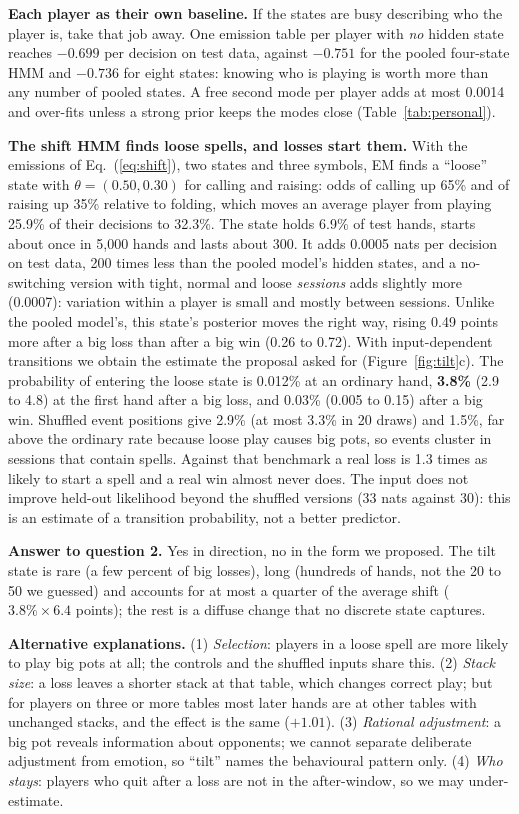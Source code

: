 \textbf{Each player as their own baseline.} If the states are busy describing who the player is, take that job away. One emission table per player with \emph{no} hidden state reaches $-0.699$ per decision on test data, against $-0.751$ for the pooled four-state HMM and $-0.736$ for eight states: knowing who is playing is worth more than any number of pooled states. A free second mode per player adds at most 0.0014 and over-fits unless a strong prior keeps the modes close (Table~\ref{tab:personal}).

\textbf{The shift HMM finds loose spells, and losses start them.} With the emissions of Eq.~(\ref{eq:shift}), two states and three symbols, EM finds a ``loose'' state with $\theta=(0.50,0.30)$ for calling and raising: odds of calling up 65\% and of raising up 35\% relative to folding, which moves an average player from playing 25.9\% of their decisions to 32.3\%. The state holds 6.9\% of test hands, starts about once in 5{,}000 hands and lasts about 300. It adds 0.0005 nats per decision on test data, 200 times less than the pooled model's hidden states, and a no-switching version with tight, normal and loose \emph{sessions} adds slightly more (0.0007): variation within a player is small and mostly between sessions. Unlike the pooled model's, this state's posterior moves the right way, rising 0.49 points more after a big loss than after a big win (0.26 to 0.72). With input-dependent transitions we obtain the estimate the proposal asked for (Figure~\ref{fig:tilt}c). The probability of entering the loose state is 0.012\% at an ordinary hand, \textbf{3.8\%} (2.9 to 4.8) at the first hand after a big loss, and 0.03\% (0.005 to 0.15) after a big win. Shuffled event positions give 2.9\% (at most 3.3\% in 20 draws) and 1.5\%, far above the ordinary rate because loose play causes big pots, so events cluster in sessions that contain spells. Against that benchmark a real loss is 1.3 times as likely to start a spell and a real win almost never does. The input does not improve held-out likelihood beyond the shuffled versions (33 nats against 30): this is an estimate of a transition probability, not a better predictor.

\textbf{Answer to question 2.} Yes in direction, no in the form we proposed. The tilt state is rare (a few percent of big losses), long (hundreds of hands, not the 20 to 50 we guessed) and accounts for at most a quarter of the average shift ($3.8\%\times6.4$ points); the rest is a diffuse change that no discrete state captures.

\textbf{Alternative explanations.} (1) \emph{Selection}: players in a loose spell are more likely to play big pots at all; the controls and the shuffled inputs share this. (2) \emph{Stack size}: a loss leaves a shorter stack at that table, which changes correct play; but for players on three or more tables most later hands are at other tables with unchanged stacks, and the effect is the same ($+1.01$). (3) \emph{Rational adjustment}: a big pot reveals information about opponents; we cannot separate deliberate adjustment from emotion, so ``tilt'' names the behavioural pattern only. (4) \emph{Who stays}: players who quit after a loss are not in the after-window, so we may under-estimate.

